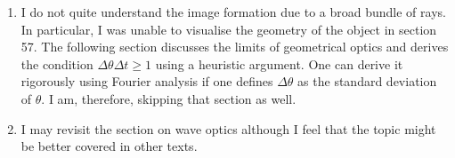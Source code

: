 \begin{enumerate}
\item I do not quite understand the image formation due to a broad bundle of 
rays. In particular, I was unable to visualise the geometry of the object in
section 57. The following section discusses the limits of geometrical optics
and derives the condition $\Delta\theta\Delta t \ge 1$ using a heuristic 
argument. One can derive it rigorously using Fourier analysis if one defines
$\Delta\theta$ as the standard deviation of $\theta$. I am, therefore, skipping
that section as well.

\item I may revisit the section on wave optics although I feel that the topic 
might be better covered in other texts.
\end{enumerate}
